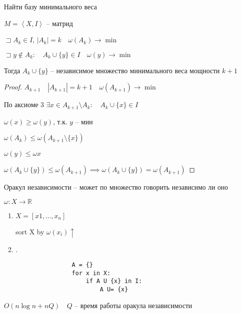 \documentclass{book}
\newcommand\R{\ensuremath{\mathbb{R}}}
\theoremstyle{definition}
\begin{document}
\begin{problem}
    Найти базу минимального веса
\end{problem}
\begin{theorem}

    $M = \left<X, I \right>$ -- матрид

    $\sqsupset A_k\in I$, $|A_k| = k\quad \omega(A_k) \to \min$   

    $\sqsupset y\not\in A_k : \quad A_k \cup \{y\}\in I\quad \omega(y) \to \min$

    Тогда $A_k \cup \{y\}$ -- независимое множество минимального веса мощности $k+1$
\end{theorem}
\begin{proof}
    $A_{k+1}\quad |A_{k+1}| = k+1\quad \omega(A_{k+1}) \to \min$

    По аксиоме 3 $\exists x\in A_{k+1} \setminus A_k:\quad A_k \cup \{x\}\in I$

    $\omega(x) \geqslant \omega(y)$, т.к. $y$ -- мин

    $\omega(A_k) \leqslant \omega(A_{k+1} \setminus \{x\})$

    $\omega(y) \leqslant  \omega x$

    $\omega(A_k \cup \{y\}) \leqslant \omega(A_{k+1}) \implies \omega(A_k\cup \{y\}) = \omega(A_{k+1})$
\end{proof}

\begin{definition}
    Оракул независимости -- может по множество говорить независимо ли оно
\end{definition}

\begin{statement}

    $\omega: X\to \R$
    \begin{enumerate}
        \item $X = \left[ x1, ..., x_n \right] $

            sort X by $\omega(x_i)\uparrow$
        \item .

            \begin{lstlisting}
                A = {}
                for x in X:
                    if A U {x} in I:
                        A U= {x}
            \end{lstlisting}
    \end{enumerate}

    $O\left( n\log n + nQ \right) \quad Q$ -- время работы оракула независимости
\end{statement}
\end{document}
